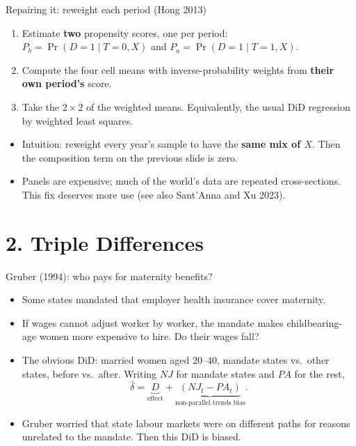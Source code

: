 \documentclass[
  11pt,
  ignorenonframetext,
  aspectratio=169,
]{beamer}
\providecommand{\tightlist}{%
  \setlength{\itemsep}{0pt}\setlength{\parskip}{0pt}}
\begin{document}
\begin{frame}{Repairing it: reweight each period (Hong 2013)}
\protect{}\label{repairing-it-reweight-each-period-hong-2013}
\begin{enumerate}
\tightlist
\item
  Estimate \textbf{two} propensity scores, one per period:
  \(P_b = \Pr(D=1 \mid T=0, X)\) and \(P_a = \Pr(D=1 \mid T=1, X)\).
\item
  Compute the four cell means with inverse-probability weights from
  \textbf{their own period's} score.
\item
  Take the \(2 \times 2\) of the weighted means. Equivalently, the usual
  DiD regression by weighted least squares.
\end{enumerate}

\vspace{0.4em}

\begin{itemize}
\tightlist
\item
  Intuition: reweight every year's sample to have the \textbf{same mix
  of \(X\)}. Then the composition term on the previous slide is zero.
\item
  Panels are expensive; much of the world's data are repeated
  cross-sections. This fix deserves more use (see also Sant'Anna and Xu
  2023).
\end{itemize}
\end{frame}

\section{2. Triple Differences}\label{triple-differences}

\begin{frame}{Gruber (1994): who pays for maternity benefits?}
\protect{}\label{gruber-1994-who-pays-for-maternity-benefits}
\begin{itemize}
\tightlist
\item
  Some states mandated that employer health insurance cover maternity.
\item
  If wages cannot adjust worker by worker, the mandate makes
  childbearing-age women more expensive to hire. Do their wages fall?
\item
  The obvious DiD: married women aged 20--40, mandate states vs.~other
  states, before vs.~after. Writing \(NJ\) for mandate states and \(PA\)
  for the rest, \[
  \hat\delta = \underbrace{D}_{\text{effect}} + \underbrace{(NJ_t - PA_t)}_{\text{non-parallel trends bias}} .
  \]
\item
  Gruber worried that state labour markets were on different paths for
  reasons unrelated to the mandate. Then this DiD is biased.
\end{itemize}
\end{frame}
\end{document}
